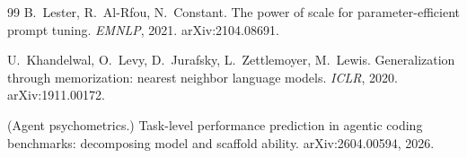 \documentclass[11pt]{article}
\theoremstyle{plain}
\theoremstyle{definition}
\theoremstyle{remark}
\begin{document}
\begin{thebibliography}{99}
 B.~Lester, R.~Al-Rfou, N.~Constant.
The power of scale for parameter-efficient prompt tuning.
\emph{EMNLP}, 2021. arXiv:2104.08691.

 U.~Khandelwal, O.~Levy, D.~Jurafsky, L.~Zettlemoyer,
M.~Lewis. Generalization through memorization: nearest neighbor language
models. \emph{ICLR}, 2020. arXiv:1911.00172.

 (Agent psychometrics.)
Task-level performance prediction in agentic coding benchmarks:
decomposing model and scaffold ability. arXiv:2604.00594, 2026.

\end{thebibliography}
\end{document}
